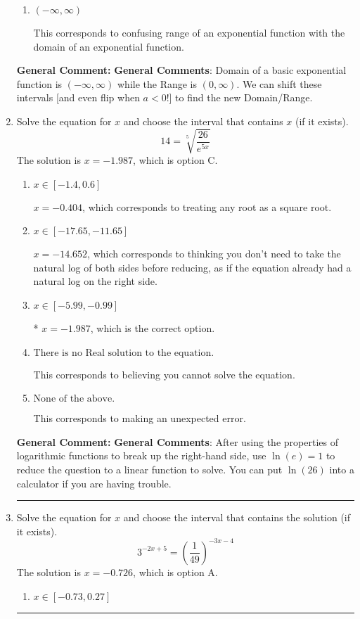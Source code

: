 \documentclass{extbook}[14pt]
\newcommand{\litem}[1]{\item #1

\rule{\textwidth}{0.4pt}}
\begin{document}
\begin{enumerate}
{\begin{enumerate}[label=\Alph*.]
$(-\infty, 8]$, which corresponds to including the endpoint.
\item \( (-\infty, \infty) \)

This corresponds to confusing range of an exponential function with the domain of an exponential function.
\end{enumerate}

\textbf{General Comment:} \textbf{General Comments}: Domain of a basic exponential function is $(-\infty, \infty)$ while the Range is $(0, \infty)$. We can shift these intervals [and even flip when $a<0$!] to find the new Domain/Range.
}
\litem{
 Solve the equation for $x$ and choose the interval that contains $x$ (if it exists).
\[  14 = \sqrt[5]{\frac{26}{e^{5x}}} \]The solution is \( x = -1.987 \), which is option C.\begin{enumerate}[label=\Alph*.]
\item \( x \in [-1.4, 0.6] \)

$x = -0.404$, which corresponds to treating any root as a square root.
\item \( x \in [-17.65, -11.65] \)

$x = -14.652$, which corresponds to thinking you don't need to take the natural log of both sides before reducing, as if the equation already had a natural log on the right side.
\item \( x \in [-5.99, -0.99] \)

* $x = -1.987$, which is the correct option.
\item \( \text{There is no Real solution to the equation.} \)

This corresponds to believing you cannot solve the equation.
\item \( \text{None of the above.} \)

This corresponds to making an unexpected error.
\end{enumerate}

\textbf{General Comment:} \textbf{General Comments}: After using the properties of logarithmic functions to break up the right-hand side, use $\ln(e) = 1$ to reduce the question to a linear function to solve. You can put $\ln(26)$ into a calculator if you are having trouble.
}
\litem{
Solve the equation for $x$ and choose the interval that contains the solution (if it exists).
\[ 3^{-2x+5} = \left(\frac{1}{49}\right)^{-3x-4} \]The solution is \( x = -0.726 \), which is option A.\begin{enumerate}[label=\Alph*.]
\item \( x \in [-0.73, 0.27] \)


\end{enumerate}}
\end{enumerate}
\end{document}
